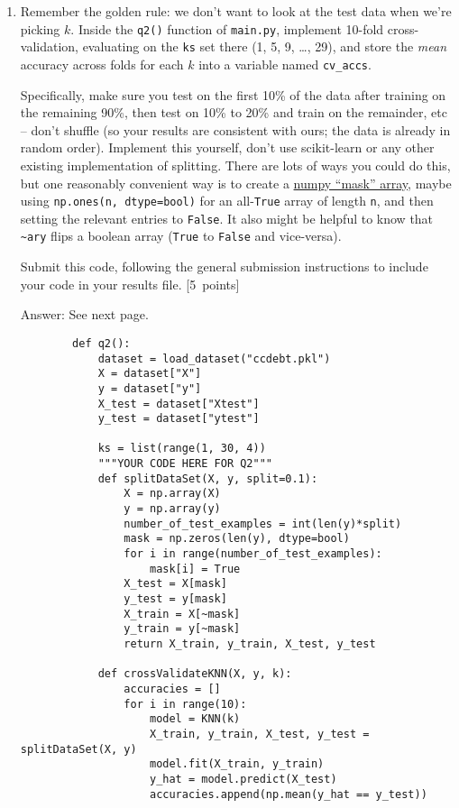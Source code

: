 \documentclass{article}
\newcommand{\blu}[1]{{\textcolor{blu}{#1}}}
\newcommand{\gre}[1]{\textcolor{gre}{#1}}
\newcommand\ans[1]{\par\gre{Answer: #1}}
\let\ask\blu
\newcommand\pts[1]{\textcolor{pointscolour}{[#1~points]}}
\begin{document}
    \begin{enumerate}
        \item Remember the golden rule: we don't want to look at the test data when we're picking $k$. Inside the \texttt{q2()} function of \texttt{main.py}, implement 10-fold cross-validation, evaluating on the \texttt{ks} set there (1, 5, 9, \dots, 29), and store the \emph{mean} accuracy across folds for each $k$ into a variable named \texttt{cv\_accs}.
        

        Specifically, make sure you test on the first 10\% of the data after training on the remaining 90\%, then test on 10\% to 20\% and train on the remainder, etc -- don't shuffle (so your results are consistent with ours; the data is already in random order). Implement this yourself, don't use scikit-learn or any other existing implementation of splitting. There are lots of ways you could do this, but one reasonably convenient way is to create a \href{https://numpy.org/doc/stable/user/basics.indexing.html#boolean-or-mask-index-arrays}{numpy ``mask'' array}, maybe using \texttt{np.ones(n, dtype=bool)} for an all-\texttt{True} array of length \texttt{n}, and then setting the relevant entries to \texttt{False}. It also might be helpful to know that \texttt{\textasciitilde ary} flips a boolean array (\texttt{True} to \texttt{False} and vice-versa).
    
        \ask{Submit this code}, following the general submission instructions to include your code in your results file. \pts{5}
        \ans{See next page.}
        \newpage
        \begin{verbatim}
        def q2():
            dataset = load_dataset("ccdebt.pkl")
            X = dataset["X"]
            y = dataset["y"]
            X_test = dataset["Xtest"]
            y_test = dataset["ytest"]
        
            ks = list(range(1, 30, 4))
            """YOUR CODE HERE FOR Q2"""
            def splitDataSet(X, y, split=0.1):
                X = np.array(X)
                y = np.array(y)
                number_of_test_examples = int(len(y)*split)
                mask = np.zeros(len(y), dtype=bool)
                for i in range(number_of_test_examples):
                    mask[i] = True
                X_test = X[mask]
                y_test = y[mask]
                X_train = X[~mask]
                y_train = y[~mask]
                return X_train, y_train, X_test, y_test
        
            def crossValidateKNN(X, y, k):
                accuracies = []
                for i in range(10):
                    model = KNN(k)
                    X_train, y_train, X_test, y_test = splitDataSet(X, y)
                    model.fit(X_train, y_train)
                    y_hat = model.predict(X_test)
                    accuracies.append(np.mean(y_hat == y_test))
                    

\end{verbatim}
\end{enumerate}
\end{document}
